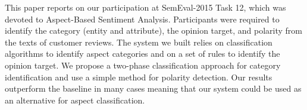 This paper reports on our participation at SemEval-2015 Task 12, which was devoted to Aspect-Based Sentiment Analysis. Participants were required to identify the category (entity and attribute), the opinion target, and polarity from the texts of customer reviews. The system we built relies on classification algorithms to identify aspect categories and on a set of rules to identify the opinion target. We propose a two-phase classification approach for category identification and use a simple method for polarity detection. Our results outperform the baseline in many cases meaning that our system could be used as an alternative for aspect classification.
